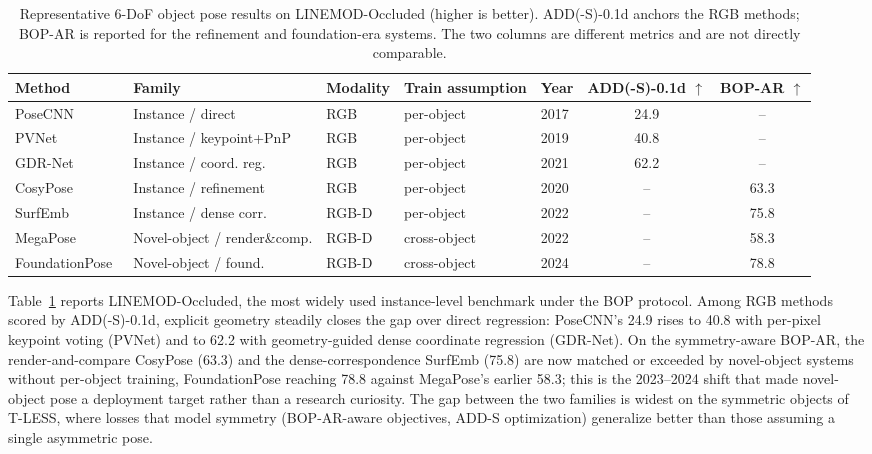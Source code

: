 \begin{table}[!t]
    \centering
    \caption{Representative 6-DoF object pose results on LINEMOD-Occluded (higher is better). ADD(-S)-0.1d anchors the RGB methods; BOP-AR is reported for the refinement and foundation-era systems. The two columns are different metrics and are not directly comparable.}
    \label{tab:pose_benchmark}
    \fontsize{9}{11}\selectfont
    \setlength{\tabcolsep}{4pt}
    \begin{tabular}{lllllcc}
        \toprule
        \textbf{Method} & \textbf{Family} & \textbf{Modality} & \textbf{Train assumption} & \textbf{Year} & \textbf{ADD(-S)-0.1d} $\uparrow$ & \textbf{BOP-AR} $\uparrow$ \\
        \midrule
        PoseCNN~\cite{xiang2017posecnn}             & Instance / direct         & RGB   & per-object   & 2017 & 24.9 & --   \\
        PVNet~\cite{peng2019pvnet}                  & Instance / keypoint+PnP   & RGB   & per-object   & 2019 & 40.8 & --   \\
        GDR-Net~\cite{wang2021gdrnet}               & Instance / coord. reg.    & RGB   & per-object   & 2021 & 62.2 & --   \\
        CosyPose~\cite{Labbe2020CosyPose}           & Instance / refinement     & RGB   & per-object   & 2020 & --   & 63.3 \\
        SurfEmb~\cite{haugaard2022surfemb}          & Instance / dense corr.    & RGB-D & per-object   & 2022 & --   & 75.8 \\
        MegaPose~\cite{labbe2022megapose}           & Novel-object / render\&comp. & RGB-D & cross-object & 2022 & --   & 58.3 \\
        FoundationPose~\cite{wen2024foundationpose} & Novel-object / found.       & RGB-D & cross-object & 2024 & --   & 78.8 \\
        \bottomrule
    \end{tabular}
\end{table}

Table~\ref{tab:pose_benchmark} reports LINEMOD-Occluded, the most widely used instance-level benchmark under the BOP protocol.
Among RGB methods scored by ADD(-S)-0.1d, explicit geometry steadily closes the gap over direct regression: PoseCNN's 24.9 rises to 40.8 with per-pixel keypoint voting (PVNet) and to 62.2 with geometry-guided dense coordinate regression (GDR-Net).
On the symmetry-aware BOP-AR, the render-and-compare CosyPose (63.3) and the dense-correspondence SurfEmb (75.8) are now matched or exceeded by novel-object systems without per-object training, FoundationPose reaching 78.8 against MegaPose's earlier 58.3; this is the 2023--2024 shift that made novel-object pose a deployment target rather than a research curiosity.
The gap between the two families is widest on the symmetric objects of T-LESS, where losses that model symmetry (BOP-AR-aware objectives, ADD-S optimization) generalize better than those assuming a single asymmetric pose.

